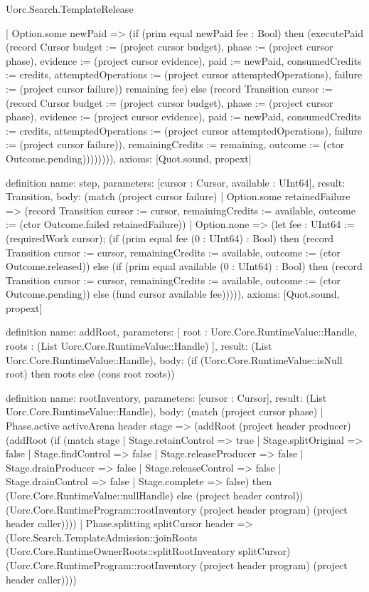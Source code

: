 \begin{lexlean}{Uorc.Search.TemplateRelease}
\begin{semanticmodule}
{          | Option.some newPaid => (if (prim equal newPaid fee : Bool) then (executePaid (record Cursor {budget := (project cursor budget), phase := (project cursor phase), evidence := (project cursor evidence), paid := newPaid, consumedCredits := credits, attemptedOperations := (project cursor attemptedOperations), failure := (project cursor failure)}) remaining fee) else (record Transition {cursor := (record Cursor {budget := (project cursor budget), phase := (project cursor phase), evidence := (project cursor evidence), paid := newPaid, consumedCredits := credits, attemptedOperations := (project cursor attemptedOperations), failure := (project cursor failure)}), remainingCredits := remaining, outcome := (ctor Outcome.pending)}))))))),
  axioms: [Quot.sound, propext]
}

definition{
  name: step,
  parameters: [cursor : Cursor, available : UInt64],
  result: Transition,
  body: (match (project cursor failure)
    | Option.some retainedFailure => (record Transition {cursor := cursor, remainingCredits := available, outcome := (ctor Outcome.failed retainedFailure)})
    | Option.none => (let fee : UInt64 := (requiredWork cursor); (if (prim equal fee (0 : UInt64) : Bool) then (record Transition {cursor := cursor, remainingCredits := available, outcome := (ctor Outcome.released)}) else (if (prim equal available (0 : UInt64) : Bool) then (record Transition {cursor := cursor, remainingCredits := available, outcome := (ctor Outcome.pending)}) else (fund cursor available fee))))),
  axioms: [Quot.sound, propext]
}

definition{
  name: addRoot,
  parameters: [
    root : Uorc.Core.RuntimeValue::Handle,
    roots : (List Uorc.Core.RuntimeValue::Handle)
  ],
  result: (List Uorc.Core.RuntimeValue::Handle),
  body: (if (Uorc.Core.RuntimeValue::isNull root) then roots else (cons root roots))
}

definition{
  name: rootInventory,
  parameters: [cursor : Cursor],
  result: (List Uorc.Core.RuntimeValue::Handle),
  body: (match (project cursor phase)
    | Phase.active activeArena header stage => (addRoot (project header producer) (addRoot (if (match stage
      | Stage.retainControl => true
      | Stage.splitOriginal => false
      | Stage.findControl => false
      | Stage.releaseProducer => false
      | Stage.drainProducer => false
      | Stage.releaseControl => false
      | Stage.drainControl => false
      | Stage.complete => false) then (Uorc.Core.RuntimeValue::nullHandle) else (project header control)) (Uorc.Core.RuntimeProgram::rootInventory (project header program) (project header caller))))
    | Phase.splitting splitCursor header => (Uorc.Search.TemplateAdmission::joinRoots (Uorc.Core.RuntimeOwnerRoots::splitRootInventory splitCursor) (Uorc.Core.RuntimeProgram::rootInventory (project header program) (project header caller))))
}


\end{semanticmodule}
\end{lexlean}
